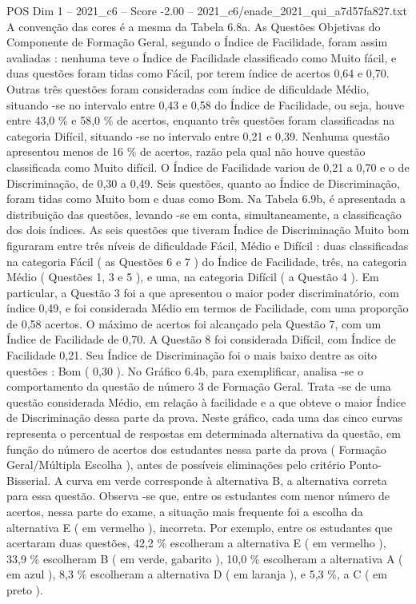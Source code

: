 \begin{textsample}{POS Dim 1 – 2021\_c6 – Score -2.00 – 2021\_c6/enade\_2021\_qui\_a7d57fa827.txt}
A convenção das cores é a mesma da Tabela 6.8a.
As Questões Objetivas do Componente de Formação Geral, segundo o Índice de Facilidade, foram assim avaliadas : nenhuma teve o Índice de Facilidade classificado como Muito fácil, e duas questões foram tidas como Fácil, por terem índice de acertos 0,64 e 0,70.
Outras três questões foram consideradas com índice de dificuldade Médio, situando -se no intervalo entre 0,43 e 0,58 do Índice de Facilidade, ou seja, houve entre 43,0 \% e 58,0 \% de acertos, enquanto três questões foram classificadas na categoria Difícil, situando -se no intervalo entre 0,21 e 0,39.
Nenhuma questão apresentou menos de 16 \% de acertos, razão pela qual não houve questão classificada como Muito difícil.
O Índice de Facilidade variou de 0,21 a 0,70 e o de Discriminação, de 0,30 a 0,49.
Seis questões, quanto ao Índice de Discriminação, foram tidas como Muito bom e duas como Bom.
Na Tabela 6.9b, é apresentada a distribuição das questões, levando -se em conta, simultaneamente, a classificação dos dois índices.
As seis questões que tiveram Índice de Discriminação Muito bom figuraram entre três níveis de dificuldade Fácil, Médio e Difícil : duas classificadas na categoria Fácil ( as Questões 6 e 7 ) do Índice de Facilidade, três, na categoria Médio ( Questões 1, 3 e 5 ), e uma, na categoria Difícil ( a Questão 4 ).
Em particular, a Questão 3 foi a que apresentou o maior poder discriminatório, com índice 0,49, e foi considerada Médio em termos de Facilidade, com uma proporção de 0,58 acertos.
O máximo de acertos foi alcançado pela Questão 7, com um Índice de Facilidade de 0,70.
A Questão 8 foi considerada Difícil, com Índice de Facilidade 0,21.
Seu Índice de Discriminação foi o mais baixo dentre as oito questões : Bom ( 0,30 ).
No Gráfico 6.4b, para exemplificar, analisa -se o comportamento da questão de número 3 de Formação Geral.
Trata -se de uma questão considerada Médio, em relação à facilidade e a que obteve o maior Índice de Discriminação dessa parte da prova.
Neste gráfico, cada uma das cinco curvas representa o percentual de respostas em determinada alternativa da questão, em função do número de acertos dos estudantes nessa parte da prova ( Formação Geral/Múltipla Escolha ), antes de possíveis eliminações pelo critério Ponto-Bisserial.
A curva em verde corresponde à alternativa B, a alternativa correta para essa questão.
Observa -se que, entre os estudantes com menor número de acertos, nessa parte do exame, a situação mais frequente foi a escolha da alternativa E ( em vermelho ), incorreta.
Por exemplo, entre os estudantes que acertaram duas questões, 42,2 \% escolheram a alternativa E ( em vermelho ), 33,9 \% escolheram B ( em verde, gabarito ), 10,0 \% escolheram a alternativa A ( em azul ), 8,3 \% escolheram a alternativa D ( em laranja ), e 5,3 \%, a C ( em preto ).

\end{textsample}
